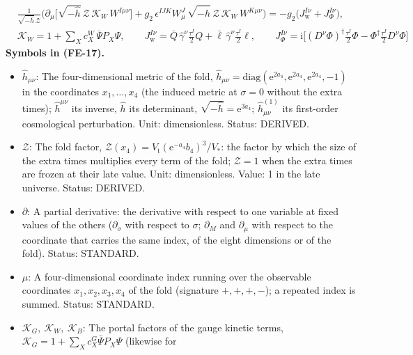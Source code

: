 \documentclass[
  10pt,
]{article}
\providecommand{\tightlist}{%
  \setlength{\itemsep}{0pt}\setlength{\parskip}{0pt}}
\begin{document}
\[
\begin{aligned}
&\frac{1}{\sqrt{-\hat h}\,\mathcal{Z}}\Big(\partial_\mu\big[\sqrt{-\hat h}\,\mathcal{Z}\,\mathcal{K}_{W}\,W^{I\mu\nu}\big]
 + g_2\,\epsilon^{IJK}W^J_\mu\,\sqrt{-\hat h}\,\mathcal{Z}\,\mathcal{K}_{W}\,W^{K\mu\nu}\Big)
 = -g_2\big(J_{\mathrm{w}}^{I\nu} + J_\Phi^{I\nu}\big),\\
&\mathcal{K}_{W} = 1 + \sum_X c^{W}_X\,\bar\Psi P_X\Psi,\qquad J_{\mathrm{w}}^{I\nu} = \bar Q\,\hat\gamma^\nu\frac{\tau^I}{2}Q + \bar\ell\,\hat\gamma^\nu\frac{\tau^I}{2}\ell,\qquad
 J_\Phi^{I\nu} = \mathrm{i}\Big[(D^\nu\Phi)^\dagger\frac{\tau^I}{2}\Phi - \Phi^\dagger\frac{\tau^I}{2}D^\nu\Phi\Big]
\end{aligned} \tag{FE-17}
\] \textbf{Symbols in (FE-17).}

\begin{itemize}
\tightlist
\item
  \(\hat h_{\mu\nu}\): The four-dimensional metric of the fold,
  \(\hat h_{\mu\nu} = \mathrm{diag}(\mathrm{e}^{2a_4}, \mathrm{e}^{2a_4}, \mathrm{e}^{2a_4}, -1)\)
  in the coordinates \(x_1, \dots, x_4\) (the induced metric at
  \(\sigma = 0\) without the extra times); \(\hat h^{\mu\nu}\) its
  inverse, \(\hat h\) its determinant,
  \(\sqrt{-\hat h} = \mathrm{e}^{3a_4}\); \(\hat h^{(1)}_{\mu\nu}\) its
  first-order cosmological perturbation. Unit: dimensionless. Status:
  DERIVED.
\item
  \(\mathcal{Z}\): The fold factor,
  \(\mathcal{Z}(x_4) = V_{\mathrm{t}}(\mathrm{e}^{-a_4}b_4)^3/V_*\): the
  factor by which the size of the extra times multiplies every term of
  the fold; \(\mathcal{Z} = 1\) when the extra times are frozen at their
  late value. Unit: dimensionless. Value: 1 in the late universe.
  Status: DERIVED.
\item
  \(\partial\): A partial derivative: the derivative with respect to one
  variable at fixed values of the others (\(\partial_\sigma\) with
  respect to \(\sigma\); \(\partial_M\) and \(\partial_\mu\) with
  respect to the coordinate that carries the same index, of the eight
  dimensions or of the fold). Status: STANDARD.
\item
  \(\mu\): A four-dimensional coordinate index running over the
  observable coordinates \(x_1, x_2, x_3, x_4\) of the fold (signature
  \(+,+,+,-\)); a repeated index is summed. Status: STANDARD.
\item
  \(\mathcal{K}_{G},\ \mathcal{K}_{W},\ \mathcal{K}_{B}\): The portal
  factors of the gauge kinetic terms,
  \(\mathcal{K}_{G} = 1 + \sum_Xc^{G}_X\bar\Psi P_X\Psi\) (likewise for

\end{itemize}
\end{document}
